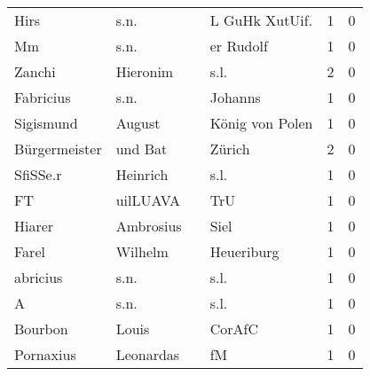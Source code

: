 \documentclass[10pt,a4paper,landscape]{article}
\begin{document}
\begin{longtable}{llllrr}
                     Hirs &                               s.n. &             &                             L GuHk XutUif.  &          1 &         0 \\
                       Mm &                               s.n. &             &                                   er Rudolf &          1 &         0 \\
                   Zanchi &                           Hieronim &             &                                        s.l. &          2 &         0 \\
                Fabricius &                               s.n. &             &                                     Johanns &          1 &         0 \\
                Sigismund &                             August &             &                             König von Polen &          1 &         0 \\
            Bürgermeister &                            und Bat &             &                                      Zürich &          2 &         0 \\
                 SfiSSe.r &                           Heinrich &             &                                        s.l. &          1 &         0 \\
                       FT &                           uilLUAVA &             &                                         TrU &          1 &         0 \\
                   Hiarer &                          Ambrosius &             &                                        Siel &          1 &         0 \\
                    Farel &                            Wilhelm &             &                                  Heueriburg &          1 &         0 \\
                 abricius &                               s.n. &             &                                        s.l. &          1 &         0 \\
                        A &                               s.n. &             &                                        s.l. &          1 &         0 \\
                  Bourbon &                              Louis &             &                                      CorAfC &          1 &         0 \\
                Pornaxius &                          Leonardas &             &                                          fM &          1 &         0 \\

\end{longtable}
\end{document}
